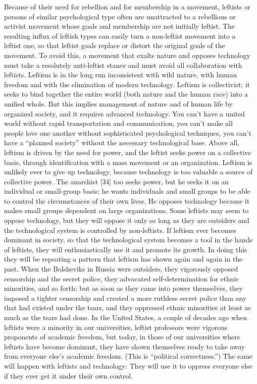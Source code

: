  Because of their need for rebellion and for membership in a movement, leftists or persons of similar psychological type often are unattracted to a rebellious or activist movement whose goals and membership are not initially leftist. The resulting influx of leftish types can easily turn a non-leftist movement into a leftist one, so that leftist goals replace or distort the original goals of the movement.
 To avoid this, a movement that exalts nature and opposes technology must take a resolutely anti-leftist stance and must avoid all collaboration with leftists. Leftism is in the long run inconsistent with wild nature, with human freedom and with the elimination of modern technology. Leftism is collectivist; it seeks to bind together the entire world (both nature and the human race) into a unified whole. But this implies management of nature and of human life by organized society, and it requires advanced technology. You can’t have a united world without rapid transportation and communication, you can’t make all people love one another without sophisticated psychological techniques, you can’t have a “planned society” without the necessary technological base. Above all, leftism is driven by the need for power, and the leftist seeks power on a collective basis, through identification with a mass movement or an organization. Leftism is unlikely ever to give up technology, because technology is too valuable a source of collective power.
 The anarchist [34] too seeks power, but he seeks it on an individual or small-group basis; he wants individuals and small groups to be able to control the circumstances of their own lives. He opposes technology because it makes small groups dependent on large organizations.
 Some leftists may seem to oppose technology, but they will oppose it only so long as they are outsiders and the technological system is controlled by non-leftists. If leftism ever becomes dominant in society, so that the technological system becomes a tool in the hands of leftists, they will enthusiastically use it and promote its growth. In doing this they will be repeating a pattern that leftism has shown again and again in the past. When the Bolsheviks in Russia were outsiders, they vigorously opposed censorship and the secret police, they advocated self-determination for ethnic minorities, and so forth; but as soon as they came into power themselves, they imposed a tighter censorship and created a more ruthless secret police than any that had existed under the tsars, and they oppressed ethnic minorities at least as much as the tsars had done. In the United States, a couple of decades ago when leftists were a minority in our universities, leftist professors were vigorous proponents of academic freedom, but today, in those of our universities where leftists have become dominant, they have shown themselves ready to take away from everyone else’s academic freedom. (This is “political correctness.”) The same will happen with leftists and technology: They will use it to oppress everyone else if they ever get it under their own control.\break
